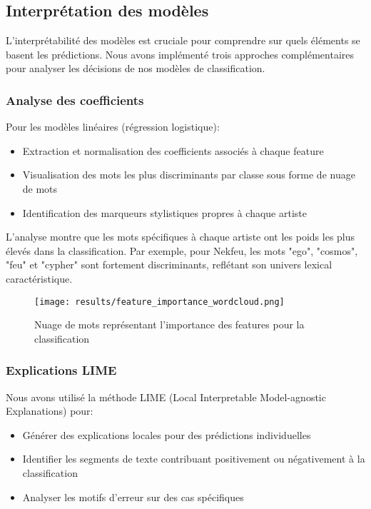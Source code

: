 \documentclass[a4paper,11pt]{article}
\begin{document}
\subsection{Interprétation des modèles}
L'interprétabilité des modèles est cruciale pour comprendre sur quels éléments se basent les prédictions. Nous avons implémenté trois approches complémentaires pour analyser les décisions de nos modèles de classification.

\subsubsection{Analyse des coefficients}
Pour les modèles linéaires (régression logistique):
\begin{itemize}
    \item Extraction et normalisation des coefficients associés à chaque feature
    \item Visualisation des mots les plus discriminants par classe sous forme de nuage de mots
    \item Identification des marqueurs stylistiques propres à chaque artiste
\end{itemize}

L'analyse montre que les mots spécifiques à chaque artiste ont les poids les plus élevés dans la classification. Par exemple, pour Nekfeu, les mots "ego", "cosmos", "feu" et "cypher" sont fortement discriminants, reflétant son univers lexical caractéristique.

\begin{figure}[ht]
    \centering
    \texttt{[image: results/feature\_importance\_wordcloud.png]}
    \caption{Nuage de mots représentant l'importance des features pour la classification}
    \label{fig:feature-importance}
\end{figure}

\subsubsection{Explications LIME}
Nous avons utilisé la méthode LIME (Local Interpretable Model-agnostic Explanations) pour:
\begin{itemize}
    \item Générer des explications locales pour des prédictions individuelles
    \item Identifier les segments de texte contribuant positivement ou négativement à la classification
    \item Analyser les motifs d'erreur sur des cas spécifiques
\end{itemize}
\end{document}
